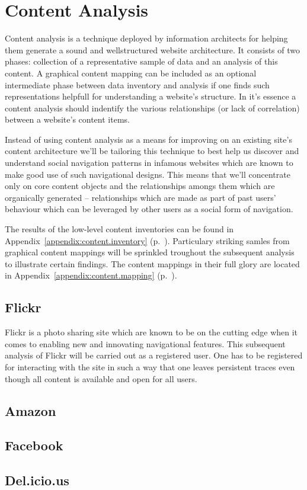 \chapter{Content Analysis}

Content analysis is a technique deployed by information architects for helping
them generate a sound and wellstructured website architecture. It consists of
two phases: collection of a representative sample of data and an analysis of
this content. A graphical content mapping can be included as an optional
intermediate phase between data inventory and analysis if one finds such
representations helpfull for understanding a website's structure.
In it's essence a content analysis should indentify the various
relationships (or lack of correlation) between a website's content items.

Instead of using content analysis as a means for improving on an existing
site's content architecture we'll be tailoring this technique to best help us
discover and understand social navigation patterns in infamous websites which
are known to make good use of such navigational designs. This means that we'll
concentrate only on core content objects and the relationships amongs them
which are organically generated -- relationships which are made as part of
past users' behaviour which can be leveraged by other users as a social form
of navigation.

The results of the low-level content inventories can be found in
Appendix~\ref{appendix:content.inventory}
(p.~\pageref{appendix:content.inventory}).
Particulary striking %
samles from graphical content mappings will be sprinkled troughout the
subsequent analysis to illustrate certain findings. The content mappings in
their full glory are located in
Appendix~\ref{appendix:content.mapping}
(p.~\pageref{appendix:content.mapping}).

\section{Flickr}

Flickr is a photo sharing site which are known to be on the cutting edge when
it comes to enabling new and innovating navigational features. This subsequent
analysis of Flickr will be carried out as a registered user. One has to be
registered for interacting with the site in such a way that one leaves
persistent traces even though all content is available and open for all users.

\section{Amazon}

\section{Facebook}

\section{Del.icio.us}
